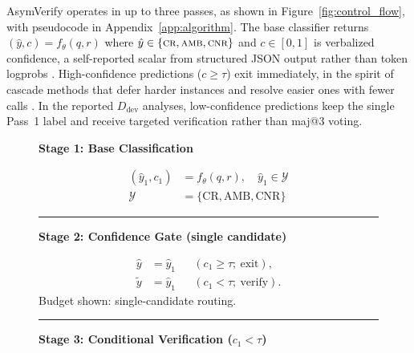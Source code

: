 \documentclass[11pt]{article}
\begin{document}
AsymVerify operates in up to three passes, as shown in Figure~\ref{fig:control_flow}, with pseudocode in Appendix~\ref{app:algorithm}. The base classifier returns $(\hat{y}, c) = f_\theta(q, r)$ where $\hat{y} \in \{\textsc{cr}, \textsc{amb}, \textsc{cnr}\}$ and $c \in [0,1]$ is verbalized confidence, a self-reported scalar from structured JSON output rather than token logprobs \citep{tian2023calibration,xiong2024uncertainty}. High-confidence predictions ($c \geq \tau$) exit immediately, in the spirit of cascade methods that defer harder instances and resolve easier ones with fewer calls \citep{gupta2024lmcascades}. In the reported $D_{\text{dev}}$ analyses, low-confidence predictions keep the single Pass~1 label and receive targeted verification rather than maj@3 voting.

\begin{figure}[t]
\centering
\begingroup
\normalsize
\setlength{\abovedisplayskip}{2pt}
\setlength{\belowdisplayskip}{2pt}
\setlength{\abovedisplayshortskip}{2pt}
\setlength{\belowdisplayshortskip}{2pt}
\setlength{\fboxsep}{3pt}
\setlength{\jot}{1pt}
\newcommand{\stagebar}{\par\vspace{2pt}\noindent\rule{\linewidth}{0.35pt}\par\vspace{2pt}}
\newcommand{\routebox}[1]{\fcolorbox{black!30}{gray!8}{\strut\quad #1\quad}}
\begin{minipage}{\columnwidth}
\centering
{\bfseries Stage 1: Base Classification}\par\vspace{-2pt}
\[
\begin{aligned}
(\hat{y}_1,c_1)&=f_\theta(q,r),\quad \hat{y}_1\in\mathcal{Y}\\
\mathcal{Y}&=\{\mathrm{CR},\mathrm{AMB},\mathrm{CNR}\}
\end{aligned}
\]
\stagebar
{\bfseries Stage 2: Confidence Gate (single candidate)}\par\vspace{-2pt}
\[
\begin{aligned}
\hat{y} &= \hat{y}_1 && (c_1 \geq \tau;\ \mathrm{exit}),\\
\tilde{y} &= \hat{y}_1
&& (c_1 < \tau;\ \mathrm{verify}).
\end{aligned}
\]
\footnotesize Budget shown: single-candidate routing.
\stagebar
{\bfseries Stage 3: Conditional Verification ($c_1<\tau$)}\par\vspace{-2pt}
\[
\begin{aligned}

\end{aligned}\]
\end{minipage}
\end{figure}
\end{document}
